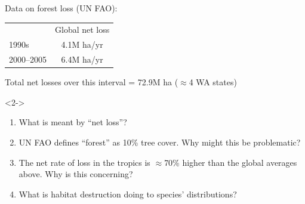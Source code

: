\begin{frame}[t]
    \begin{adjustwidth}{-2em}{-1.5em}
        \vspace{-3mm}
        Data on forest loss (UN FAO):

        \begin{table}%
            \centering
            \begin{tabular}{ l c }
                & Global net loss \\
                \cline{2-2}
                1990s & 4.1M ha/yr \\[2ex]
                2000--2005 & 6.4M ha/yr \\
            \end{tabular}
        \end{table}

        \vspace{2mm}
        Total net losses over this interval = 72.9M ha ($\approx$4 WA states)

        \begin{uncoverenv}<2->
        \begin{enumerate}
                \small
            \item What is meant by ``net loss''?


            \item UN FAO defines ``forest'' as 10\% tree cover. Why might this
                be problematic?


            \item The net rate of loss in the tropics is $\approx$70\% higher
                than the global averages above. Why is this concerning?


            \item What is habitat destruction doing to species' distributions?


        \end{enumerate}
        \end{uncoverenv}
    \end{adjustwidth}
\end{frame}

